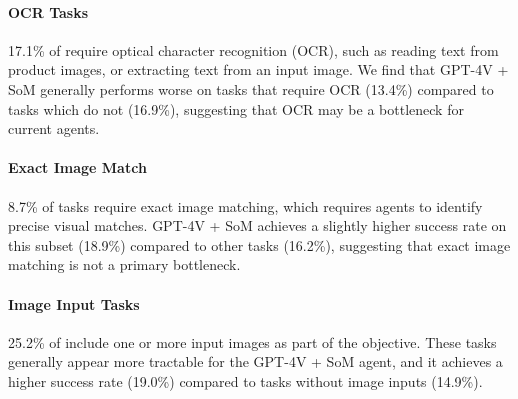 \begin{table}[t] %
\centering
{}
\caption{Success rate (SR) of GPT-4V (SoM) across different types of tasks.}  \label{tab:analysis_subsets}
\end{table}

\paragraph{OCR Tasks} 17.1\% of \BenchmarkName{} require optical character recognition (OCR), such as reading text from product images, or extracting text from an input image. We find that GPT-4V + SoM generally performs worse on tasks that require OCR (13.4\%) compared to tasks which do not (16.9\%), suggesting that OCR may be a bottleneck for current agents.

\paragraph{Exact Image Match} 8.7\% of tasks require exact image matching, which requires agents to identify precise visual matches. GPT-4V + SoM achieves a slightly higher success rate on this subset (18.9\%) compared to other tasks (16.2\%), suggesting that exact image matching is not a primary bottleneck.


\paragraph{Image Input Tasks} 25.2\% of \BenchmarkName{} include one or more input images as part of the objective. These tasks generally appear more tractable for the GPT-4V + SoM agent, and it achieves a higher success rate (19.0\%) compared to tasks without image inputs (14.9\%).%




